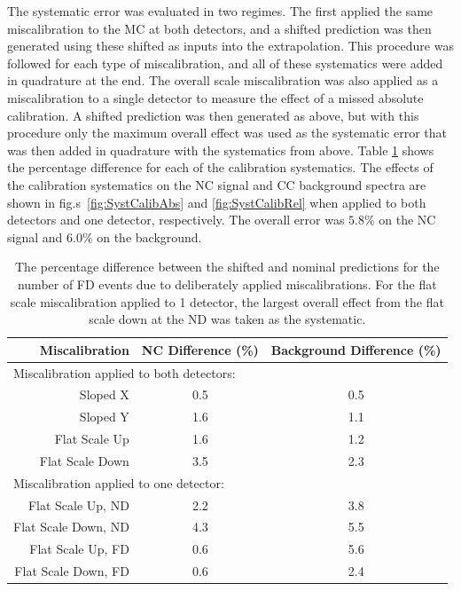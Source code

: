 The systematic error was evaluated in two regimes. The first applied the same miscalibration to the MC at both detectors, and a shifted prediction was then generated using these shifted as inputs into the extrapolation. This procedure was followed for each type of miscalibration, and all of these systematics were added in quadrature at the end. The overall scale miscalibration was also applied as a miscalibration to a single detector to measure the effect of a missed absolute calibration. A shifted prediction was then generated as above, but with this procedure only the maximum overall effect was used as the systematic error that was then added in quadrature with the systematics from above. Table \ref{tab:SystCalib} shows the percentage difference for each of the calibration systematics. The effects of the calibration systematics on the NC signal and CC background spectra are shown in fig.s~\ref{fig:SystCalibAbs} and \ref{fig:SystCalibRel} when applied to both detectors and one detector, respectively. The overall error was $5.8\%$ on the NC signal and $6.0\%$ on the background.
\begin{table}[h]
  \begin{center}
    \caption[Calibration Systematic Errors]{The percentage difference between the shifted and nominal predictions for the number of FD events due to deliberately applied miscalibrations. For the flat scale miscalibration applied to 1 detector, the largest overall effect from the flat scale down at the ND was taken as the systematic.}
    \label{tab:SystCalib}
    \begin{tabular}{r c c}
      \hline\hline
      Miscalibration & NC Difference (\%) & Background Difference (\%) \\
      \hline
      \multicolumn{3}{l}{Miscalibration applied to both detectors:} \\
      Sloped X & 0.5 & 0.5 \\
      Sloped Y & 1.6 & 1.1 \\
      Flat Scale Up & 1.6 & 1.2 \\
      Flat Scale Down & 3.5 & 2.3 \\
      \multicolumn{3}{l}{Miscalibration applied to one detector:} \\
      Flat Scale Up, ND & 2.2 & 3.8 \\
      Flat Scale Down, ND & 4.3 & 5.5 \\
      Flat Scale Up, FD & 0.6 & 5.6 \\
      Flat Scale Down, FD & 0.6 & 2.4 \\
      \hline
    \end{tabular}
  \end{center}
\end{table}

